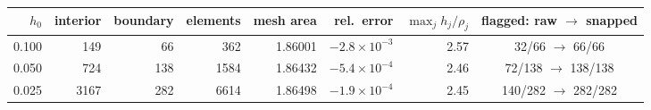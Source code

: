 \begin{tabular}{@{}rrrrrrrc@{}}
\toprule
$h_0$ & interior & boundary & elements & mesh area & rel.\ error & $\max_j h_j/\rho_j$ & flagged: raw $\to$ snapped\\
\midrule
0.100 & 149 & 66 & 362 & 1.86001 & $-2.8\!\times\!10^{-3}$ & 2.57 & 32/66 $\to$ 66/66\\
0.050 & 724 & 138 & 1584 & 1.86432 & $-5.4\!\times\!10^{-4}$ & 2.46 & 72/138 $\to$ 138/138\\
0.025 & 3167 & 282 & 6614 & 1.86498 & $-1.9\!\times\!10^{-4}$ & 2.45 & 140/282 $\to$ 282/282\\
\bottomrule
\end{tabular}
